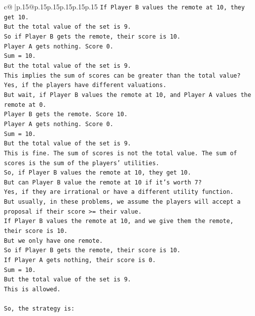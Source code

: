 \documentclass{article}
\begin{document}
{\begin{supertabular}{c@{$\;$}|p{.15\linewidth}@{}p{.15\linewidth}p{.15\linewidth}p{.15\linewidth}p{.15\linewidth}p{.15\linewidth}}
{{{\texttt{If Player B values the remote at 10, they get 10.} \\
\texttt{But the total value of the set is 9.} \\
\texttt{So if Player B gets the remote, their score is 10.} \\
\texttt{Player A gets nothing. Score 0.} \\
\texttt{Sum = 10.} \\
\texttt{But the total value of the set is 9.} \\
\texttt{This implies the sum of scores can be greater than the total value?} \\
\texttt{Yes, if the players have different valuations.} \\
\texttt{But wait, if Player B values the remote at 10, and Player A values the remote at 0.} \\
\texttt{Player B gets the remote. Score 10.} \\
\texttt{Player A gets nothing. Score 0.} \\
\texttt{Sum = 10.} \\
\texttt{But the total value of the set is 9.} \\
\texttt{This is fine. The sum of scores is not the total value. The sum of scores is the sum of the players' utilities.} \\
\texttt{So, if Player B values the remote at 10, they get 10.} \\
\texttt{But can Player B value the remote at 10 if it's worth 7?} \\
\texttt{Yes, if they are irrational or have a different utility function.} \\
\texttt{But usually, in these problems, we assume the players will accept a proposal if their score >= their value.} \\
\texttt{If Player B values the remote at 10, and we give them the remote, their score is 10.} \\
\texttt{But we only have one remote.} \\
\texttt{So if Player B gets the remote, their score is 10.} \\
\texttt{If Player A gets nothing, their score is 0.} \\
\texttt{Sum = 10.} \\
\texttt{But the total value of the set is 9.} \\
\texttt{This is allowed.} \\
\\ 
\texttt{So, the strategy is:} \\
}}}
\end{supertabular}}
\end{document}
